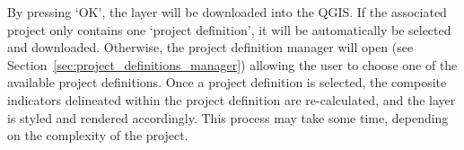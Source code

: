 By pressing `OK', the layer will be downloaded into the QGIS\@. If the associated
project only contains one `project definition', it will be automatically be
selected and downloaded. Otherwise, the project definition manager will open
(see Section~\ref{sec:project_definitions_manager}) allowing the user to choose
one of the available project definitions. Once a project definition is
selected, the composite indicators delineated within the project definition are
re-calculated, and the layer is styled and rendered accordingly. This process
may take some time, depending on the complexity of the project.
